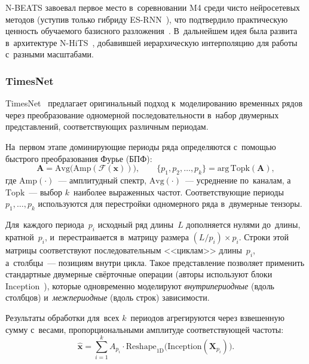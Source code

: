 N-BEATS завоевал первое место в~соревновании M4 среди чисто нейросетевых
методов (уступив только гибриду ES-RNN~\cite{smyl2020hybrid}), что
подтвердило практическую ценность обучаемого базисного
разложения~\cite{oreshkin2020nbeats}.  В~дальнейшем идея была развита
в~архитектуре N-HiTS~\cite{challu2023nhits}, добавившей иерархическую
интерполяцию для работы с~разными масштабами.


\subsubsection{TimesNet}
\label{sssec:timesnet}

TimesNet~\cite{wu2023timesnet} предлагает оригинальный подход
к~моделированию временных рядов через преобразование одномерной
последовательности в~набор двумерных представлений, соответствующих
различным периодам.

На~первом этапе доминирующие периоды ряда определяются с~помощью
быстрого преобразования Фурье (БПФ):
\begin{equation}
\label{eq:timesnet-fft}
\mathbf{A} = \mathrm{Avg}\!\bigl(\mathrm{Amp}(\mathcal{F}(\mathbf{x}))\bigr), \qquad
\{p_1, p_2, \ldots, p_k\} = \mathrm{arg\,Topk}(\mathbf{A}),
\end{equation}
где $\mathrm{Amp}(\cdot)$~--- амплитудный спектр,
$\mathrm{Avg}(\cdot)$~--- усреднение по~каналам, а~$\mathrm{Topk}$~---
выбор $k$~наиболее выраженных частот.  Соответствующие периоды
$p_1, \ldots, p_k$ используются для перестройки одномерного ряда
в~двумерные тензоры.

Для~каждого периода~$p_i$ исходный ряд длины~$L$ дополняется нулями
до~длины, кратной~$p_i$, и~перестраивается в~матрицу размера
$(L/p_i) \times p_i$.  Строки этой матрицы соответствуют последовательным
<<циклам>> длины~$p_i$, а~столбцы~--- позициям внутри цикла.  Такое
представление позволяет применить стандартные двумерные свёрточные
операции (авторы используют блоки
Inception~\cite{wu2023timesnet}), которые одновременно моделируют
\textit{внутрипериодные} (вдоль столбцов) и~\textit{межпериодные}
(вдоль строк) зависимости.

Результаты обработки для~всех $k$~периодов агрегируются через
взвешенную сумму с~весами, пропорциональными амплитуде
соответствующей частоты:
\begin{equation}
\label{eq:timesnet-agg}
\hat{\mathbf{x}} = \sum_{i=1}^{k} A_{p_i} \cdot \mathrm{Reshape}_{1\mathrm{D}}\!\bigl(\mathrm{Inception}(\mathbf{X}_{p_i})\bigr).
\end{equation}

